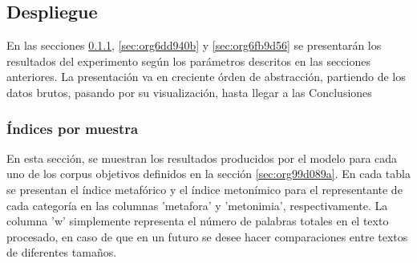 \documentclass[12pt,letterpaper,twoside]{article}
\begin{document}
\subsection{Despliegue}
\label{sec:org1cc358a}
En las secciones \ref{sec:org9699b00}, \ref{sec:org6dd940b} y
\ref{sec:org6fb9d56} se presentarán los resultados del experimento
según los parámetros descritos en las secciones anteriores.
La presentación va en creciente órden de abstracción, partiendo
de los datos brutos, pasando por su visualización, hasta llegar
a las Conclusiones 

\subsubsection{Índices por muestra}
\label{sec:org9699b00}
En esta sección, se muestran los resultados producidos por el modelo
para cada uno de los corpus objetivos definidos en la sección
\ref{sec:org99d089a}. En cada tabla se presentan el índice
metafórico y el índice metonímico para el representante de cada
categoría en las columnas 'metafora' y 'metonimia',
respectivamente. La columna 'w' simplemente representa el número de
palabras totales en el texto procesado, en caso de que en un futuro se
desee hacer comparaciones entre textos de diferentes tamaños.
\end{document}
